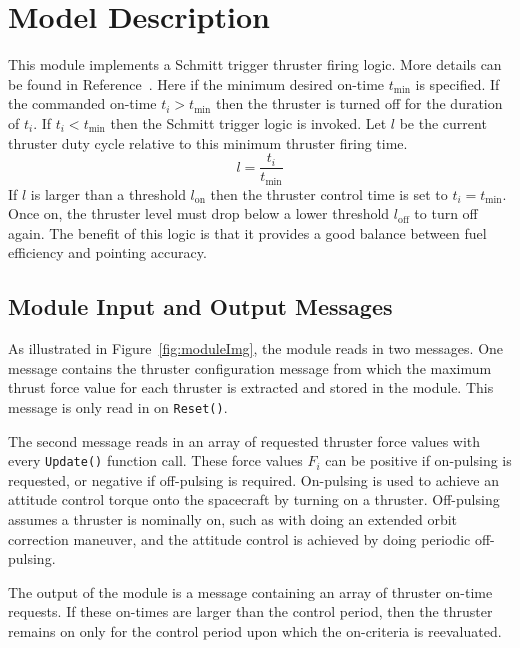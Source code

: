 


\section{Model Description}
This module implements a Schmitt trigger thruster firing logic.  More details can be found in Reference~.    Here if the minimum desired on-time $t_{\text{min}}$ is specified.  If the commanded on-time $t_{i}>t_{\text{min}}$ then the thruster is turned off for the duration of $t_{i}$.  If $t_{i}< t_{\text{min}}$ then the Schmitt trigger logic is invoked.  Let $l$ be the current thruster duty cycle relative to this minimum thruster firing time.
$$
	l = \frac{t_{i}}{t_{\text{min}}}
$$
If $l$ is larger than a threshold $l_{\text{on}}$ then the thruster control time is set to $t_{i} = t_{\text{min}}$.  Once on, the thruster level must drop below a lower threshold $l_{\text{off}}$ to turn off again.  The benefit of this logic is that it provides a good balance between fuel efficiency and pointing accuracy.  


\subsection{Module Input and Output Messages}
As illustrated in Figure~\ref{fig:moduleImg}, the module reads in two messages.  One message contains the thruster configuration message from which the maximum thrust force value for each thruster is extracted and stored in the module.  This message is only read in on {\tt Reset()}.  

The second message reads in an array of requested thruster force values with every {\tt Update()} function call.  These force values $F_{i}$ can be positive if on-pulsing is requested, or negative if off-pulsing is required.  On-pulsing is used to achieve an attitude control torque onto the spacecraft by turning on a thruster.  Off-pulsing assumes a thruster is nominally on, such as with doing an extended orbit correction maneuver, and the attitude control is achieved by doing periodic off-pulsing.  

The output of the module is a message containing an array of thruster on-time requests.  If these on-times are larger than the control period, then the thruster remains on only for the control period upon which the on-criteria is reevaluated.  


